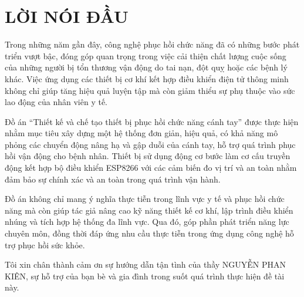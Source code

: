 \section*{LỜI NÓI ĐẦU}
\thispagestyle{empty}
Trong những năm gần đây, công nghệ phục hồi chức năng đã có những bước phát triển vượt bậc, đóng góp quan trọng trong việc cải thiện chất lượng cuộc sống của những người bị tổn thương vận động do tai nạn, đột quỵ hoặc các bệnh lý khác. Việc ứng dụng các thiết bị cơ khí kết hợp điều khiển điện tử thông minh không chỉ giúp tăng hiệu quả luyện tập mà còn giảm thiểu sự phụ thuộc vào sức lao động của nhân viên y tế.

Đồ án “Thiết kế và chế tạo thiết bị phục hồi chức năng cánh tay” được thực hiện nhằm mục tiêu xây dựng một hệ thống đơn giản, hiệu quả, có khả năng mô phỏng các chuyển động nâng hạ và gập duỗi của cánh tay, hỗ trợ quá trình phục hồi vận động cho bệnh nhân. Thiết bị sử dụng động cơ bước làm cơ cấu truyền động kết hợp bộ điều khiển ESP8266 với các cảm biến đo vị trí và an toàn nhằm đảm bảo sự chính xác và an toàn trong quá trình vận hành.

Đồ án không chỉ mang ý nghĩa thực tiễn trong lĩnh vực y tế và phục hồi chức năng mà còn giúp tác giả nâng cao kỹ năng thiết kế cơ khí, lập trình điều khiển nhúng và tích hợp hệ thống đa lĩnh vực. Qua đó, góp phần phát triển năng lực chuyên môn, đồng thời đáp ứng nhu cầu thực tiễn trong ứng dụng công nghệ hỗ trợ phục hồi sức khỏe.

Tôi xin chân thành cảm ơn sự hướng dẫn tận tình của thầy NGUYỄN PHAN KIÊN, sự hỗ trợ của bạn bè và gia đình trong suốt quá trình thực hiện đề tài này.
\cleardoublepage